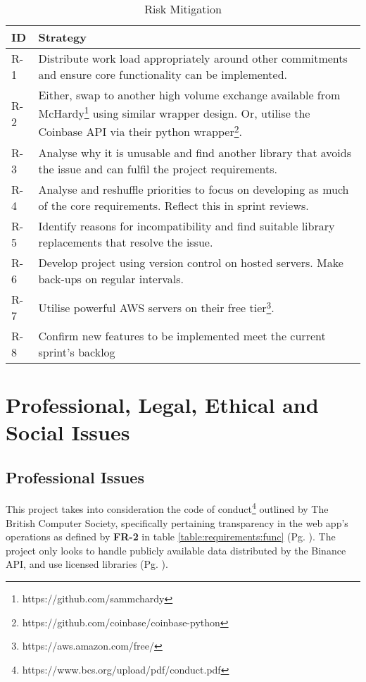 \begin{table}[htb!]
\centering
\begin{tabular}{|l|p{}|}
\hline
\textbf{ID} & \textbf{Strategy} \\ \hline\hline
R-1 & Distribute work load appropriately around other commitments and ensure core functionality can be implemented. \\ \hline
R-2 & Either, swap to another high volume exchange available from McHardy\footnote{https://github.com/sammchardy} using similar wrapper design. Or, utilise the Coinbase API via their python wrapper\footnote{https://github.com/coinbase/coinbase-python}. \\ \hline
R-3 & Analyse why it is unusable and find another library that avoids the issue and can fulfil the project requirements. \\ \hline
R-4 & Analyse and reshuffle priorities to focus on developing as much of the core requirements. Reflect this in sprint reviews. \\ \hline
R-5 & Identify reasons for incompatibility and find suitable library replacements that resolve the issue. \\ \hline
R-6 & Develop project using version control on hosted servers. Make back-ups on regular intervals. \\ \hline
R-7 & Utilise powerful AWS servers on their free tier\footnote{https://aws.amazon.com/free/}. \\ \hline
R-8 & Confirm new features to be implemented meet the current sprint's backlog  \\ \hline
\end{tabular}
\caption{Risk Mitigation}
\label{table:management:risk_mitigation}
\end{table}


\section{Professional, Legal, Ethical and Social Issues}
\subsection{Professional Issues}
This project takes into consideration the code of conduct\footnote{https://www.bcs.org/upload/pdf/conduct.pdf} outlined by The British Computer Society, specifically pertaining transparency in the web app's operations as defined by \textbf{FR-2} in table \ref{table:requirements:func} (Pg. \pageref{table:requirements:func}). The project only looks to handle publicly available data distributed by the Binance API, and use licensed libraries (Pg. \pageref{sec:related:developmentLibraries}).

